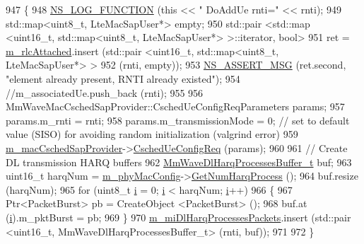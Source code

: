 \begin{DoxyCode}
947 \{
948         \hyperlink{log-macros-disabled_8h_a90b90d5bad1f39cb1b64923ea94c0761}{NS\_LOG\_FUNCTION} (\textcolor{keyword}{this} << \textcolor{stringliteral}{" DoAddUe rnti="} << rnti);
949         std::map<uint8\_t, LteMacSapUser*> empty;
950         std::pair <std::map <uint16\_t, std::map<uint8\_t, LteMacSapUser*> >::iterator, \textcolor{keywordtype}{bool}>
951          ret = \hyperlink{classns3_1_1MmWaveEnbMac_a13e4bafd30f3edae1f5dc1192c9b3011}{m\_rlcAttached}.insert (std::pair <uint16\_t,  std::map<uint8\_t, LteMacSapUser*> >
952                                                                   (rnti, empty));
953         \hyperlink{assert_8h_aff5ece9066c74e681e74999856f08539}{NS\_ASSERT\_MSG} (ret.second, \textcolor{stringliteral}{"element already present, RNTI already existed"});
954         \textcolor{comment}{//m\_associatedUe.push\_back (rnti);}
955 
956         MmWaveMacCschedSapProvider::CschedUeConfigReqParameters params;
957         params.m\_rnti = rnti;
958         params.m\_transmissionMode = 0; \textcolor{comment}{// set to default value (SISO) for avoiding random initialization
       (valgrind error)}
959         \hyperlink{classns3_1_1MmWaveEnbMac_a2a5b4d485b804ee199f04494f6645e55}{m\_macCschedSapProvider}->\hyperlink{classns3_1_1MmWaveMacCschedSapProvider_aaa8875f4b9b93463ddfd54e4eaa30080}{CschedUeConfigReq} (params);
960 
961         \textcolor{comment}{// Create DL transmission HARQ buffers}
962         \hyperlink{namespacens3_a7bb8c3b0b6663dc0e37e226a167498dd}{MmWaveDlHarqProcessesBuffer\_t} buf;
963         uint16\_t harqNum = \hyperlink{classns3_1_1MmWaveEnbMac_a358d0c9a4ae2249b604143e654e7d45e}{m\_phyMacConfig}->\hyperlink{classns3_1_1MmWavePhyMacCommon_a40773d84172ebeb5aff125f56ebcc5ac}{GetNumHarqProcess} ();
964         buf.resize (harqNum);
965         \textcolor{keywordflow}{for} (uint8\_t \hyperlink{bernuolliDistribution_8m_a6f6ccfcf58b31cb6412107d9d5281426}{i} = 0; \hyperlink{bernuolliDistribution_8m_a6f6ccfcf58b31cb6412107d9d5281426}{i} < harqNum; \hyperlink{bernuolliDistribution_8m_a6f6ccfcf58b31cb6412107d9d5281426}{i}++)
966         \{
967                 Ptr<PacketBurst> pb = CreateObject <PacketBurst> ();
968                 buf.at (\hyperlink{bernuolliDistribution_8m_a6f6ccfcf58b31cb6412107d9d5281426}{i}).m\_pktBurst = pb;
969         \}
970         \hyperlink{classns3_1_1MmWaveEnbMac_aa2508718e6021eb3e796e5aeab6dc219}{m\_miDlHarqProcessesPackets}.insert (std::pair <uint16\_t,
       MmWaveDlHarqProcessesBuffer\_t> (rnti, buf));
971 
972 \}
\end{DoxyCode}



